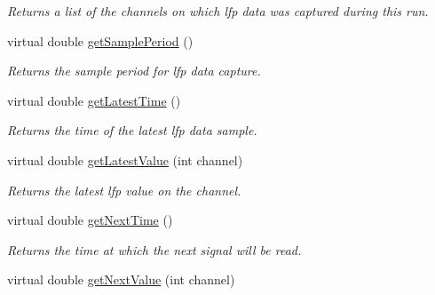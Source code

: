 \begin{DoxyCompactItemize}
\begin{DoxyCompactList}\small\item\em Returns a list of the channels on which lfp data was captured during this run. \end{DoxyCompactList}\item 
\hypertarget{class_picto_1_1_live_lfp_reader_a69f73319a6938e375e6721d5ff755430}{virtual double \hyperlink{class_picto_1_1_live_lfp_reader_a69f73319a6938e375e6721d5ff755430}{get\-Sample\-Period} ()}\label{class_picto_1_1_live_lfp_reader_a69f73319a6938e375e6721d5ff755430}

\begin{DoxyCompactList}\small\item\em Returns the sample period for lfp data capture. \end{DoxyCompactList}\item 
\hypertarget{class_picto_1_1_live_lfp_reader_a02f2775da8a898bd2096ee33cdbbbd8d}{virtual double \hyperlink{class_picto_1_1_live_lfp_reader_a02f2775da8a898bd2096ee33cdbbbd8d}{get\-Latest\-Time} ()}\label{class_picto_1_1_live_lfp_reader_a02f2775da8a898bd2096ee33cdbbbd8d}

\begin{DoxyCompactList}\small\item\em Returns the time of the latest lfp data sample. \end{DoxyCompactList}\item 
\hypertarget{class_picto_1_1_live_lfp_reader_ac92cd2f69ba1c5b0e023aa1b90974219}{virtual double \hyperlink{class_picto_1_1_live_lfp_reader_ac92cd2f69ba1c5b0e023aa1b90974219}{get\-Latest\-Value} (int channel)}\label{class_picto_1_1_live_lfp_reader_ac92cd2f69ba1c5b0e023aa1b90974219}

\begin{DoxyCompactList}\small\item\em Returns the latest lfp value on the channel. \end{DoxyCompactList}\item 
\hypertarget{class_picto_1_1_live_lfp_reader_a6e674c17ab817ceb516d819afc4c2e77}{virtual double \hyperlink{class_picto_1_1_live_lfp_reader_a6e674c17ab817ceb516d819afc4c2e77}{get\-Next\-Time} ()}\label{class_picto_1_1_live_lfp_reader_a6e674c17ab817ceb516d819afc4c2e77}

\begin{DoxyCompactList}\small\item\em Returns the time at which the next signal will be read. \end{DoxyCompactList}\item 
\hypertarget{class_picto_1_1_live_lfp_reader_abf0c233a531ebf5faabbb05776eade3c}{virtual double \hyperlink{class_picto_1_1_live_lfp_reader_abf0c233a531ebf5faabbb05776eade3c}{get\-Next\-Value} (int channel)}\label{class_picto_1_1_live_lfp_reader_abf0c233a531ebf5faabbb05776eade3c}


\end{DoxyCompactItemize}
